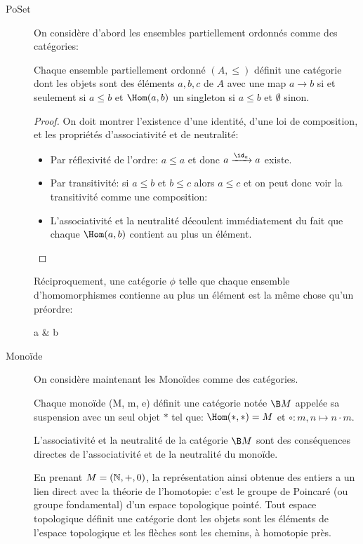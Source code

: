 \documentclass[math]{cours}
\begin{document}
\begin{exemple}
	\begin{description}
	\item[PoSet] On considère d'abord les ensembles partiellement ordonnés comme des catégories:
		\begin{proposition}
	Chaque ensemble partiellement ordonné $(A, \leq)$ définit une catégorie dont les objets sont des éléments $a, b, c$ de $A$
		avec une map $a\to b$ si et seulement si $a \leq b$ et $\Hom(a, b)$ un singleton si $a\leq b$ et $\emptyset$ sinon.
	\label{prop:posetcat}
	\end{proposition}
\begin{proof}
	On doit montrer l'existence d'une identité, d'une loi de composition, et les propriétés d'associativité et de neutralité:
		\begin{itemize}
				\item Par réflexivité de l'ordre: $a \leq a$ et donc $a \xrightarrow{\id_{a}} a$ existe.
					\item Par transitivité: si $a \leq b$ et $b \leq c$ alors $a\leq c$ et on peut donc voir la transitivité comme une composition:
						\item L'associativité et la neutralité découlent immédiatement du fait que chaque $\Hom(a, b)$ contient au plus un élément.
						\end{itemize}
			\end{proof}

	Réciproquement, une catégorie $\phi$ telle que chaque ensemble d'homomorphismes contienne au plus un élément est la même chose qu'un préordre:
\begin{category}
	a  &
		b 
\end{category}

	\item[Monoïde] On considère maintenant les Monoïdes comme des catégories.
\begin{proposition}
	Chaque monoïde (M, m, e) définit une catégorie notée $\B M$ appelée sa suspension avec un seul objet $*$ tel que:
		$\Hom(*, *) = M$ et $\circ: m, n \mapsto n\cdot m$.
	\label{prop:moncat}
	\end{proposition}
	L'associativité et la neutralité de la catégorie $\B M$ sont des conséquences directes de l'associativité et de la neutralité du monoïde.

	\begin{remarque}
En prenant $M = \left(\mathbb{N}, +, 0\right)$, la représentation ainsi obtenue des entiers a un lien direct avec la théorie de l'homotopie: c'est le groupe de Poincaré (ou groupe fondamental) d'un espace topologique pointé.
Tout espace topologique définit une catégorie dont les objets sont les éléments de l'espace topologique et les flèches sont les chemins, à homotopie près.
\end{remarque}


\end{description}
\end{exemple}
\end{document}
